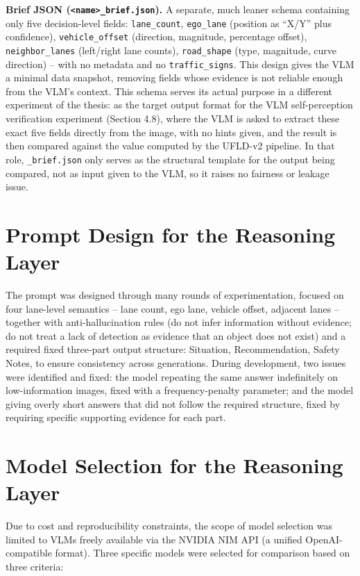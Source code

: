 \documentclass[12pt,a4paper]{report}
\begin{document}
\textbf{Brief JSON (\texttt{<name>\_brief.json}).} A separate, much leaner schema containing only five decision-level fields: \texttt{lane\_count}, \texttt{ego\_lane} (position as ``X/Y'' plus confidence), \texttt{vehicle\_offset} (direction, magnitude, percentage offset), \texttt{neighbor\_lanes} (left/right lane counts), \texttt{road\_shape} (type, magnitude, curve direction) -- with no metadata and no \texttt{traffic\_signs}. This design gives the VLM a minimal data snapshot, removing fields whose evidence is not reliable enough from the VLM's context. This schema serves its actual purpose in a different experiment of the thesis: as the target output format for the VLM self-perception verification experiment (Section 4.8), where the VLM is asked to extract these exact five fields directly from the image, with no hints given, and the result is then compared against the value computed by the UFLD-v2 pipeline. In that role, \texttt{\_brief.json} only serves as the structural template for the output being compared, not as input given to the VLM, so it raises no fairness or leakage issue.

\section{Prompt Design for the Reasoning Layer}

The prompt was designed through many rounds of experimentation, focused on four lane-level semantics -- lane count, ego lane, vehicle offset, adjacent lanes -- together with anti-hallucination rules (do not infer information without evidence; do not treat a lack of detection as evidence that an object does not exist) and a required fixed three-part output structure: Situation, Recommendation, Safety Notes, to ensure consistency across generations. During development, two issues were identified and fixed: the model repeating the same answer indefinitely on low-information images, fixed with a frequency-penalty parameter; and the model giving overly short answers that did not follow the required structure, fixed by requiring specific supporting evidence for each part.

\section{Model Selection for the Reasoning Layer}

Due to cost and reproducibility constraints, the scope of model selection was limited to VLMs freely available via the NVIDIA NIM API (a unified OpenAI-compatible format). Three specific models were selected for comparison based on three criteria:
\end{document}
